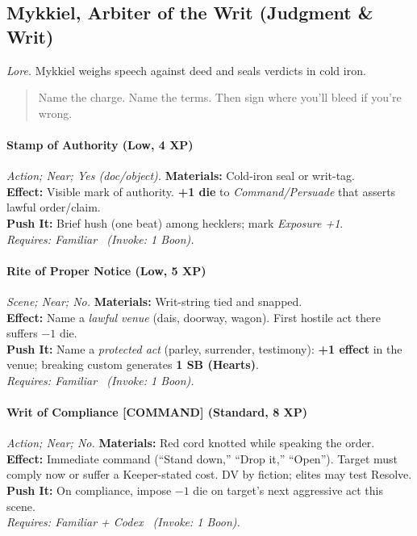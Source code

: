\subsection{Mykkiel, Arbiter of the Writ (Judgment \& Writ)}
\textit{Lore.} Mykkiel weighs speech against deed and seals verdicts in cold iron.

\begin{quote}
Name the charge. Name the terms. Then sign where you’ll bleed if you’re wrong.
\end{quote}

\paragraph{Stamp of Authority (Low, 4 XP)} \emph{Action; Near; Yes (doc/object).}
\textbf{Materials:} Cold-iron seal or writ-tag.\\
\textbf{Effect:} Visible mark of authority. \textbf{+1 die} to \emph{Command/Persuade} that asserts lawful order/claim.\\
\textbf{Push It:} Brief hush (one beat) among hecklers; mark \emph{Exposure +1}.\\
\emph{Requires: Familiar \ (\textit{Invoke:} 1 Boon).}

\paragraph{Rite of Proper Notice (Low, 5 XP)} \emph{Scene; Near; No.}
\textbf{Materials:} Writ-string tied and snapped.\\
\textbf{Effect:} Name a \emph{lawful venue} (dais, doorway, wagon). First hostile act there suffers \(-1\) die.\\
\textbf{Push It:} Name a \emph{protected act} (parley, surrender, testimony): \textbf{+1 effect} in the venue; breaking custom generates \textbf{1 SB (Hearts)}.\\
\emph{Requires: Familiar \ (\textit{Invoke:} 1 Boon).}

\paragraph{Writ of Compliance \textnormal{[COMMAND]} (Standard, 8 XP)} \emph{Action; Near; No.}
\textbf{Materials:} Red cord knotted while speaking the order.\\
\textbf{Effect:} Immediate command (“Stand down,” “Drop it,” “Open”). Target must comply now or suffer a Keeper-stated cost. DV by fiction; elites may test Resolve.\\
\textbf{Push It:} On compliance, impose \(-1\) die on target’s next aggressive act this scene.\\
\emph{Requires: Familiar + Codex \ (\textit{Invoke:} 1 Boon).}

